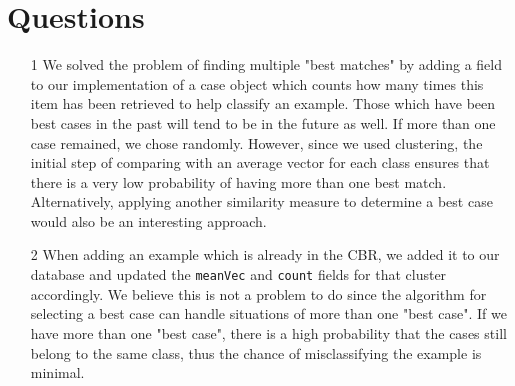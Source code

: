 \documentclass[a4paper,12pt,oneside,final]{report}
\begin{document}
\section{Questions}
\begin{itemize}
\item[1] We solved the problem of finding multiple "best matches" by adding a field to our implementation of a case object which counts how many times this item has been retrieved to help classify an example.  Those which have been best cases in the past will tend to be in the future as well.  If more than one case remained, we chose randomly.  However, since we used clustering, the initial step of comparing with an average vector for each class ensures that there is a very low probability of having more than one best match.  Alternatively, applying another similarity measure to determine a best case would also be an interesting approach.
\item[2]  When adding an example which is already in the CBR, we added it to our database and updated the \verb+meanVec+ and \verb+count+ fields for that cluster accordingly.  We believe this is not a problem to do since the algorithm for selecting a best case can handle situations of more than one "best case".  If we have more than one "best case", there is a high probability that the cases still belong to the same class, thus the chance of misclassifying the example is minimal.


\end{itemize}
\end{document}
